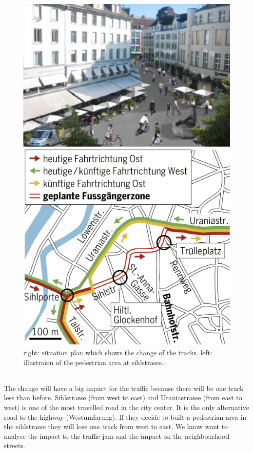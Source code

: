 \documentclass[11pt]{article}
\begin{document}
\begin{figure}[h]
\begin{minipage}[t]{.45\textwidth}
	\centering
	\vspace{30pt}
\includegraphics[width=\textwidth]{pedestrianarea.png}
\end{minipage}\hfill
\begin{minipage}[t]{.45\textwidth}
	\centering
	\vspace{0pt}
\includegraphics[width=\textwidth]{Plan_Sihlstrasse.png}
\end{minipage}\hfill
\caption{right: situation plan which shows the change of the tracks. left: illustraion of the pedestrian area at sihlstrasse.}
\end{figure}
\\
The change will have a big impact for the traffic because there will be one track less than before. Sihlstrasse (from west to east) and Uraniastrasse (from east to west) is one of the most travelled  road in the city center. It is the only alternative road to the highway (Westumfarung). If they decide to built a pedestrian area in the sihlstrasse they will lose one track from west to east.
We know want to analyse the impact to the traffic jam and the impact on the neighbourhood streets.
\end{document}
